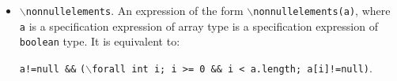 \documentclass[a4paper]{llncs}
\begin{document}
\begin{itemize}

\item{\texttt{$\backslash$nonnullelements}.} An expression of the form
\texttt{$\backslash$nonnullelements(a)}, where \texttt{a} is a
specification expression of array type is a specification expression
of \texttt{boolean} type. It is equivalent to$:$

\texttt{a!=null \&\&}
\texttt{($\backslash$forall int i; i >= 0 \&\& i < a.length;
a[i]!=null)}. 

\end{itemize}




\end{document}

